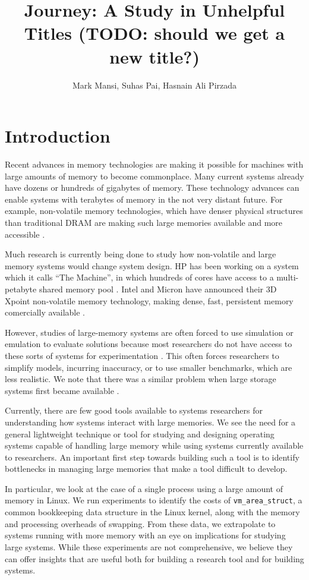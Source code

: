 \documentclass[twocolumn,11pt]{article}
\title{Journey: A Study in Unhelpful Titles (TODO: should we get a new title?)}
\author{Mark Mansi, Suhas Pai, Hasnain Ali Pirzada}
\date{}
\begin{document}
\maketitle

\section{Introduction}

Recent advances in memory technologies are making it possible for machines with
large amounts of memory to become commonplace. Many current systems already
have dozens or hundreds of gigabytes of memory. These technology advances can
enable systems with terabytes of memory in the not very distant future. For
example, non-volatile memory technologies, which have denser physical
structures than traditional DRAM are making such large memories available and
more accessible \cite{xpoint}.

Much research is currently being done to study how non-volatile and large
memory systems would change system design. HP has been working on a system
which it calls ``The Machine'', in which hundreds of cores have access to a
multi-petabyte shared memory pool \cite{hp_machine}. Intel and
Micron have announced their 3D Xpoint non-volatile memory technology, making
dense, fast, persistent memory comercially available \cite{xpoint}.

However, studies of large-memory systems are often forced to use simulation or
emulation to evaluate solutions because most researchers do not have access to
these sorts of systems for experimentation \cite{quartz}. This often
forces researchers to simplify models, incurring inaccuracy, or to use smaller
benchmarks, which are less realistic. We note that there was a similar problem
when large storage systems first became available \cite{david, exalt}.

Currently, there are few good tools available to systems researchers for
understanding how systems interact with large memories. We see the need for a
general lightweight technique or tool for studying and designing operating
systems capable of handling large memory while using systems currently
available to researchers.  An important first step towards building such a tool
is to identify bottlenecks in managing large memories that make a tool
difficult to develop. 

In particular, we look at the case of a single process using a large amount of
memory in Linux. We run experiments to identify the costs of
\texttt{vm\_area\_struct}, a common bookkeeping data structure in the Linux
kernel, along with the memory and processing overheads of swapping. From these
data, we extrapolate to systems running with more memory with an eye on
implications for studying large systems. While these experiments are not
comprehensive, we believe they can offer insights that are useful both for
building a research tool and for building systems.
\end{document}
